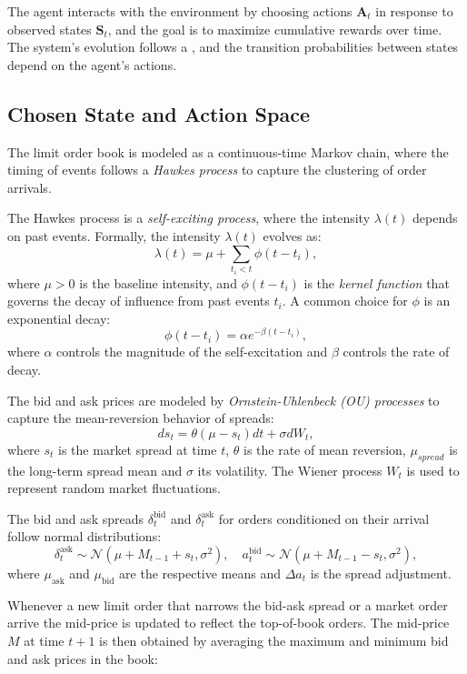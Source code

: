The agent interacts with the environment by choosing actions \( \mathbf{A}_t \) in response to observed states \( \mathbf{S}_t \), and the goal is to maximize cumulative rewards over time. The system's evolution follows a , and the transition probabilities between states depend on the agent's actions.

\subsection{Chosen State and Action Space}
The limit order book is modeled as a continuous-time Markov chain, where the timing of events follows a \textit{Hawkes process} to capture the clustering of order arrivals.

The Hawkes process is a \textit{self-exciting process}, where the intensity \( \lambda(t) \) depends on past events. Formally, the intensity \( \lambda(t) \) evolves as:
$$
\lambda(t) = \mu + \sum_{t_i < t} \phi(t - t_i),
$$
where \( \mu > 0 \) is the baseline intensity, and \( \phi(t - t_i) \) is the \textit{kernel function} that governs the decay of influence from past events \( t_i \). A common choice for \( \phi \) is an exponential decay:
$$
\phi(t - t_i) = \alpha e^{-\beta (t - t_i)},
$$
where \( \alpha \) controls the magnitude of the self-excitation and \( \beta \) controls the rate of decay.

The bid and ask prices are modeled by \textit{Ornstein-Uhlenbeck (OU) processes} to capture the mean-reversion behavior of spreads:
$$
ds_t = \theta(\mu - s_t) dt + \sigma dW_t,
$$
where \( s_t \) is the market spread at time \( t \), \( \theta \) is the rate of mean reversion, \( \mu_{spread} \) is the long-term spread mean and \( \sigma \) its volatility. The Wiener process \( W_t \) is used to represent random market fluctuations.

The bid and ask spreads \( \delta_t^{\text{bid}} \) and \( \delta_t^{\text{ask}} \) for orders conditioned on their arrival follow normal distributions:
$$
\delta_t^{\text{ask}} \sim \mathcal{N}(\mu + M_{t-1} + s_t, \sigma^2), \quad a_t^{\text{bid}} \sim \mathcal{N}(\mu + M_{t-1} - s_t, \sigma^2),
$$
where \( \mu_{\text{ask}} \) and \( \mu_{\text{bid}} \) are the respective means and \( \Delta a_t \) is the spread adjustment.

Whenever a new limit order that narrows the bid-ask spread or a market order arrive the mid-price is updated to reflect the top-of-book orders. The mid-price \( M \) at time $t+1$ is then obtained by averaging the maximum and minimum bid and ask prices in the book:

